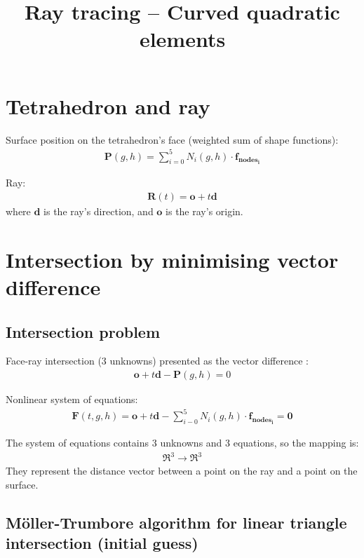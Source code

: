 \documentclass[preprint,12pt]{interact}
\begin{document}
\begin{frontmatter}



\title{Ray tracing – Curved quadratic elements}



\end{frontmatter}

\section{Tetrahedron and ray}

Surface position on the tetrahedron's face (weighted sum of shape functions):
\begin{align}
	\bm{P}(g,h) = \sum_{i=0}^{5} N_i(g,h) \cdot \bm{f_{nodes_i}}
\end{align}

Ray:
\begin{align}
	\bm{R} (t) = \bm{o} + t \bm{d}
\end{align}
where $\bm{d}$ is the ray's direction, and $\bm{o}$ is the ray's origin.

\section{Intersection by minimising vector difference}

\subsection{Intersection problem}\label{intersect}

Face-ray intersection (3 unknowns) presented as the vector difference \cite{ray_tracing_intro, ray_tracing_Toth}:
\begin{align}
	\bm{o} + t \bm{d} - \bm{P}(g,h) = 0
\end{align}

Nonlinear system of equations:
\begin{align}
	\bm{F} (t,g,h) = \bm{o} + t \bm{d} - \sum_{i-0}^{5} N_i(g,h) \cdot \bm{f_{nodes_i}} = \bm{0}
\end{align}

The system of equations contains 3 unknowns and 3 equations, so the mapping is:
\begin{align}
	\Re^3 \rightarrow \Re^3
\end{align}
They represent the distance vector between a point on the ray and a point on the surface.

\subsection{Möller-Trumbore algorithm for linear triangle intersection (initial guess)}\label{MT}
\end{document}
